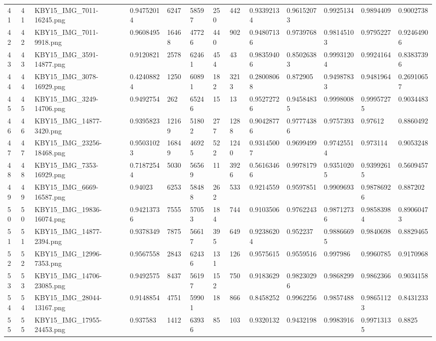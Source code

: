 \documentclass[11pt, a4paper, twoside]{report}
\begin{document}
\begin{longtable}[c]{@{}lllllllllllll@{}}
41 & 41 & KBY15\_IMG\_7011-16245.png & 0.94752014 & 6247 & 58597 & 250 & 442 & 0.93392134 & 0.96152073 & 0.9925134 & 0.9894409 & 0.9002738 \\
42 & 42 & KBY15\_IMG\_7011-9918.png & 0.9608495 & 16468 & 47726 & 440 & 902 & 0.94807136 & 0.9739768 & 0.98145103 & 0.9795227 & 0.92464906 \\
43 & 43 & KBY15\_IMG\_3591-14877.png & 0.9120821 & 2578 & 62461 & 454 & 43 & 0.98359406 & 0.85026383 & 0.99931204 & 0.9924164 & 0.83837396 \\
44 & 44 & KBY15\_IMG\_3078-16929.png & 0.42408824 & 1250 & 60891 & 182 & 3213 & 0.28008068 & 0.872905 & 0.94987833 & 0.9481964 & 0.26910657 \\
45 & 45 & KBY15\_IMG\_3249-14706.png & 0.9492754 & 262 & 65246 & 15 & 13 & 0.95272726 & 0.94584835 & 0.9998008 & 0.99957275 & 0.9034483 \\
46 & 46 & KBY15\_IMG\_14877-3420.png & 0.9395823 & 12169 & 51802 & 277 & 1288 & 0.90428776 & 0.97774386 & 0.9757393 & 0.97612 & 0.8860492 \\
47 & 47 & KBY15\_IMG\_23256-18468.png & 0.95031023 & 16849 & 46925 & 522 & 1240 & 0.93145007 & 0.9699499 & 0.97425514 & 0.973114 & 0.9053248 \\
48 & 48 & KBY15\_IMG\_7353-16929.png & 0.71872544 & 5030 & 56569 & 11 & 3926 & 0.56163466 & 0.9978179 & 0.93510205 & 0.93992615 & 0.5609457 \\
49 & 49 & KBY15\_IMG\_6669-16587.png & 0.94023 & 6253 & 58488 & 262 & 533 & 0.9214559 & 0.9597851 & 0.9909693 & 0.98786926 & 0.887202 \\
50 & 50 & KBY15\_IMG\_19836-16074.png & 0.94213736 & 7555 & 57053 & 184 & 744 & 0.9103506 & 0.9762243 & 0.98712736 & 0.98583984 & 0.89060473 \\
51 & 51 & KBY15\_IMG\_14877-2394.png & 0.9378349 & 7875 & 56617 & 395 & 649 & 0.92386204 & 0.952237 & 0.98866695 & 0.9840698 & 0.8829465 \\
52 & 52 & KBY15\_IMG\_12996-7353.png & 0.9567558 & 2843 & 62436 & 131 & 126 & 0.9575615 & 0.9559516 & 0.997986 & 0.9960785 & 0.9170968 \\
53 & 53 & KBY15\_IMG\_14706-23085.png & 0.9492575 & 8437 & 56197 & 152 & 750 & 0.9183629 & 0.98230296 & 0.9868299 & 0.9862366 & 0.9034158 \\
54 & 54 & KBY15\_IMG\_28044-13167.png & 0.9148854 & 4751 & 59901 & 18 & 866 & 0.8458252 & 0.9962256 & 0.9857488 & 0.98651123 & 0.8431233 \\
55 & 55 & KBY15\_IMG\_17955-24453.png & 0.937583 & 1412 & 63936 & 85 & 103 & 0.9320132 & 0.9432198 & 0.9983916 & 0.99713135 & 0.8825 \\

\end{longtable}
\end{document}
